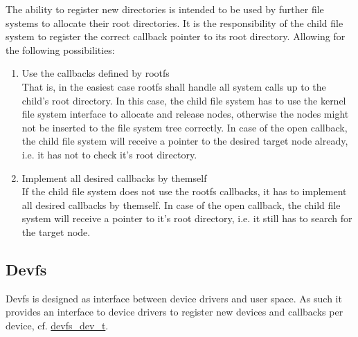 		The ability to register new directories is intended to be used by further file systems to allocate their root directories. It is the responsibility of the child file system to register the correct callback pointer to its root directory. Allowing for the following possibilities:
		\begin{enumerate}
			\item Use the callbacks defined by rootfs\\
				That is, in the easiest case rootfs shall handle all system calls up to the child's root directory. In this case, the child file system has to use the kernel file system interface to allocate and release nodes, otherwise the nodes might not be inserted to the file system tree correctly.
				In case of the open callback, the child file system will receive a pointer to the desired target node already, i.e. it has not to check it's root directory.

			\item Implement all desired callbacks by themself\\
				 If the child file system does not use the rootfs callbacks, it has to implement all desired callbacks by themself.
				 In case of the open callback, the child file system will receive a pointer to it's root directory, i.e. it still has to search for the target node.
		\end{enumerate}
		
	\subsection{Devfs}
		Devfs is designed as interface between device drivers and user space. As such it provides an interface to device drivers to register new devices and callbacks per device, cf. \hyperref[structdevfs__dev__t]{devfs\_dev\_t}.
